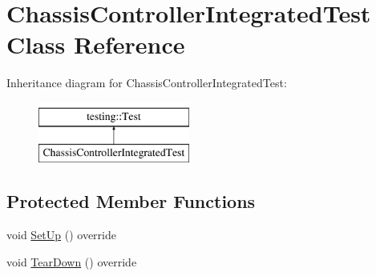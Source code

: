 \hypertarget{classChassisControllerIntegratedTest}{}\section{Chassis\+Controller\+Integrated\+Test Class Reference}
\label{classChassisControllerIntegratedTest}
Inheritance diagram for Chassis\+Controller\+Integrated\+Test\+:\begin{figure}[H]
\begin{center}
\leavevmode
\includegraphics[height=2.000000cm]{classChassisControllerIntegratedTest}
\end{center}
\end{figure}
\subsection*{Protected Member Functions}
\begin{DoxyCompactItemize}
\item 
void \mbox{\hyperlink{classChassisControllerIntegratedTest_af6648baed314ea25d318f2e3ca5f389e}{Set\+Up}} () override
\item 
void \mbox{\hyperlink{classChassisControllerIntegratedTest_a6f345a6aff193cec7f401f85b4686c09}{Tear\+Down}} () override
\end{DoxyCompactItemize}
